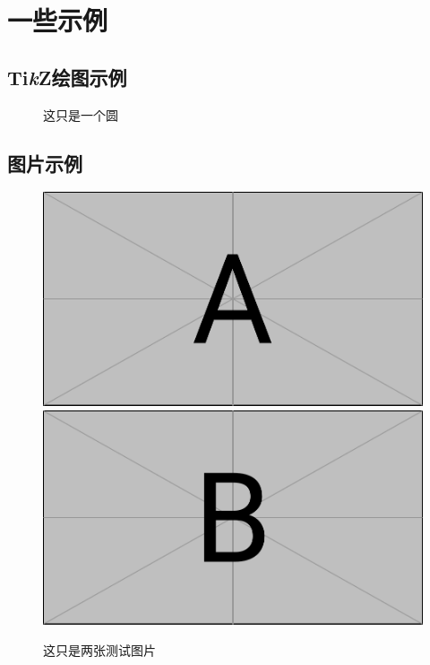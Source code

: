 \section{一些示例}
\subsection{Ti\textit{k}Z绘图示例}
\begin{figure}[htbp!]
    \centering
    \caption{这只是一个圆}
\end{figure}

\subsection{图片示例}
\begin{figure}[htbp!]
    \centering
    \includegraphics[scale = 0.35]{../res/TestFigureA.pdf}
    \quad
    \includegraphics[scale = 0.35]{../res/TestFigureB.pdf}
    \caption{这只是两张测试图片}
\end{figure}

